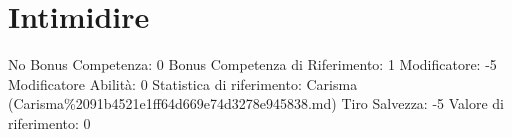 \section{Intimidire}\label{intimidire}

\begin{description}
\tightlist
\item[Tags: ABI]
No Bonus Competenza: 0 Bonus Competenza di Riferimento: 1 Modificatore:
-5 Modificatore Abilità: 0 Statistica di riferimento: Carisma
(Carisma\%2091b4521e1ff64d669e74d3278e945838.md) Tiro Salvezza: -5
Valore di riferimento: 0
\end{description}
